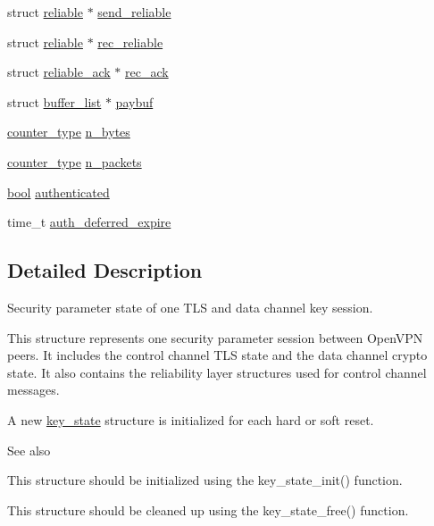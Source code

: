 \begin{DoxyCompactItemize}
struct \hyperlink{structreliable}{reliable} $\ast$ \hyperlink{structkey__state_ad0f7af5a94d446e54c369daa1e958f91}{send\+\_\+reliable}
\item 
struct \hyperlink{structreliable}{reliable} $\ast$ \hyperlink{structkey__state_aa273f201b4616a39658dcebe4ffaac14}{rec\+\_\+reliable}
\item 
struct \hyperlink{structreliable__ack}{reliable\+\_\+ack} $\ast$ \hyperlink{structkey__state_a9ac0c8a06752a5b8a3a9174e00731332}{rec\+\_\+ack}
\item 
struct \hyperlink{structbuffer__list}{buffer\+\_\+list} $\ast$ \hyperlink{structkey__state_a06941b42dfd2fcce8ec6c63884839554}{paybuf}
\item 
\hyperlink{common_8h_a00dd6fbfb368a41945c8c6b9d6fbf88f}{counter\+\_\+type} \hyperlink{structkey__state_af754aaae84d755b996fd939f0be15d16}{n\+\_\+bytes}
\item 
\hyperlink{common_8h_a00dd6fbfb368a41945c8c6b9d6fbf88f}{counter\+\_\+type} \hyperlink{structkey__state_afe288dd340ed182991a423d78de3440a}{n\+\_\+packets}
\item 
\hyperlink{automatic_8c_abb452686968e48b67397da5f97445f5b}{bool} \hyperlink{structkey__state_a0db9f9f7a64b1668c0422bcb24ee714f}{authenticated}
\item 
time\+\_\+t \hyperlink{structkey__state_ad8a078848dbcb00d4255b6cae875b9a4}{auth\+\_\+deferred\+\_\+expire}
\end{DoxyCompactItemize}


\subsection{Detailed Description}
Security parameter state of one T\+L\+S and data channel key session.

This structure represents one security parameter session between Open\+V\+P\+N peers. It includes the control channel T\+L\+S state and the data channel crypto state. It also contains the reliability layer structures used for control channel messages.

A new {\ttfamily \hyperlink{structkey__state}{key\+\_\+state}} structure is initialized for each hard or soft reset.

\begin{DoxySeeAlso}{See also}

\begin{DoxyItemize}
\item This structure should be initialized using the {\ttfamily key\+\_\+state\+\_\+init()} function.
\item This structure should be cleaned up using the {\ttfamily key\+\_\+state\+\_\+free()} function. 
\end{DoxyItemize}
\end{DoxySeeAlso}


